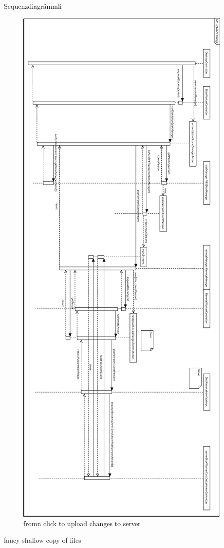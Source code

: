 Sequenzdiagrämmli

\begin{figure}[h!]
\centering
\includegraphics[width=\textwidth,height=\textheight,keepaspectratio]{figures/22uploadChanges.eps}
\caption{fromn click to upload changes to server}
\label{fig:scenario_offline_mode}
\end{figure}

 fancy shallow copy of files